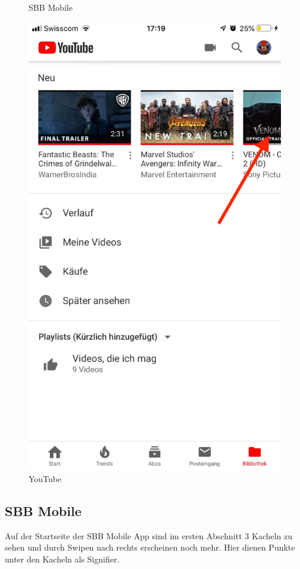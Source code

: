 \begin{figure}[H]
\begin{minipage}[b]{0.45\textwidth}
    \label{fig:sbb}
    \caption{SBB Mobile}
  \end{minipage}
  \hfill
  \begin{minipage}[b]{0.45\textwidth}
    \includegraphics[width=\textwidth]{data/YouTube.jpeg}
    \caption{YouTube}
    \label{fig:youtube}
  \end{minipage}
\end{figure}

\subsection*{SBB Mobile}
Auf der Startseite der SBB Mobile App sind 
im ersten Abschnitt 3 Kacheln zu sehen und durch Swipen nach rechts erscheinen noch mehr. 
Hier dienen Punkte unter den Kacheln als Signifier.

